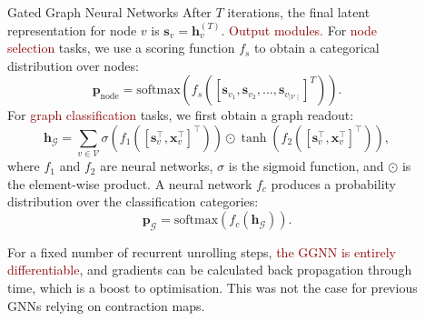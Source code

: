 \documentclass[final,hyperref={pdfpagelabels=false}]{beamer}
\newcommand{\shrink}{-15pt}
\begin{document}
\begin{frame}[t]
\begin{columns}[t]
\begin{column}{.3\textwidth}
\begin{block}{Gated Graph Neural Networks}
    After $T$ iterations, the final latent representation for node $v$ is $\mathbf{s}_v = \mathbf{h}_v^{(T)}$.
    \textcolor{darkred}{Output modules.} For \textcolor{darkred}{node selection} tasks, we use a scoring function $f_s$ to obtain a categorical distribution over nodes:
        \begin{equation}
            \mathbf{p}_{\mathrm{node}} = \mathrm{softmax}\left(f_s([\mathbf{s}_{v_1}, \mathbf{s}_{v_2}, \ldots, \mathbf{s}_{v_{\mid \mathcal{V}\mid}}]^T)\right).
        \end{equation}
    For \textcolor{darkred}{graph classification} tasks, we first obtain a graph readout:
        \begin{equation}
            \mathbf{h}_{\mathcal{G}} =
                \sum_{v\in\mathcal{V}}  
                \sigma \left(f_1\left([\mathbf{s}_v^\top, \mathbf{x}_v^\top]^\top\right)\right)
                \odot
                \tanh \left(f_2\left([\mathbf{s}_v^\top, \mathbf{x}_v^\top]^\top\right)\right),
        \end{equation}
        where $f_1$ and $f_2$ are neural networks, $\sigma$ is the sigmoid function, and $\odot$ is the element-wise product. A neural network $f_c$ produces a probability distribution over the classification categories:
        \begin{equation}
            \mathbf{p}_{\mathcal{G}} = \mathrm{softmax}\left(f_c\left(\mathbf{h}_{\mathcal{G}}\right)\right).
        \end{equation}
    
    For a fixed number of recurrent unrolling steps, \textcolor{darkred}{the GGNN is entirely differentiable}, and gradients can be calculated back propagation through time, which is a boost to optimisation. This was not the case for previous GNNs relying on contraction maps.

    \end{block}
    
    
    
    
  \end{column} %


  \begin{column}{.02\textwidth}\end{column} %

  \begin{column}{.3\textwidth} %
    

\end{column}
\end{columns}
\end{frame}
\end{document}
